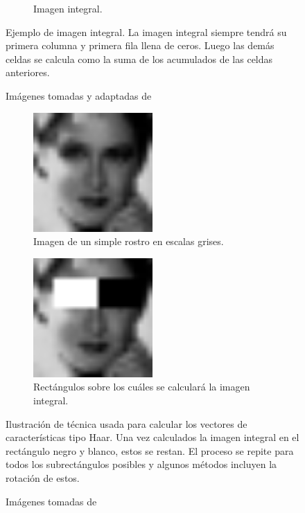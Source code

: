 \documentclass[a4paper,openright,12pt]{report}
\begin{document}
\begin{enumerate}
\begin{figure}[H]
\begin{subfigure}[b]{0.4\textwidth}
        \caption{Imagen integral.}
        \label{fig:integral-image-output}
      \end{subfigure}
      \caption{Ejemplo de imagen integral. La imagen integral siempre tendrá
      su primera columna y primera fila llena de ceros. Luego las demás celdas
      se calcula como la suma de los acumulados de las celdas anteriores.}
      \caption*{Imágenes tomadas y adaptadas de \cite{IntegralImageMathworks}}
    \end{figure}

    \begin{figure}[H]
      \begin{subfigure}[b]{0.4\textwidth}
        \includegraphics[width=0.5\textwidth]{../images/haar-face1.png}
        \caption{Imagen de un simple rostro en escalas grises.}
        \label{fig:haar-face}
      \end{subfigure}
      \hfill
      \begin{subfigure}[b]{0.4\textwidth}
        \includegraphics[width=0.5\textwidth]{../images/haar-face2.png}
        \caption{Rectángulos sobre los cuáles se calculará la imagen integral.}
        \label{fig:haar-face-with-rectangles}
      \end{subfigure}
      \caption{Ilustración de técnica usada para calcular los vectores de
      características tipo Haar. Una vez calculados la imagen integral en el
      rectángulo negro y blanco, estos se restan. El proceso se repite para
      todos los subrectángulos posibles y algunos métodos incluyen la rotación
      de estos.}
      \caption*{Imágenes tomadas de \cite{wang2014analysis}
      }
    \end{figure}


\end{enumerate}
\end{document}
